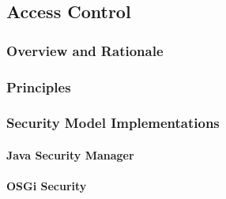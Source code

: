 \subsection{Access Control}

\subsubsection{Overview and Rationale}

\subsubsection{Principles}

\subsubsection{Security Model Implementations}

	\paragraph{Java Security Manager}
	
	\paragraph{OSGi Security}